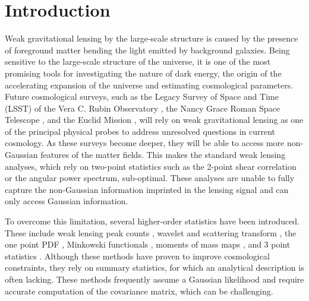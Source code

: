 \documentclass{aa}
\begin{document}
\section{Introduction}
Weak gravitational lensing by the large-scale structure is caused by the presence of foreground matter bending the light emitted by background galaxies. Being sensitive to the large-scale structure of the universe, it is one of the most promising tools for investigating the nature of dark energy, the origin of the accelerating expansion of the universe and estimating cosmological parameters. Future cosmological surveys, such as the Legacy Survey of Space and Time (LSST) of the Vera C. Rubin Observatory \citep{ivezic2019lsst}, the Nancy Grace Roman Space Telescope \citep{spergel2015wide}, and  the Euclid Mission \citep{laureijs2011euclid}, will rely on weak gravitational lensing as one of the principal physical probes to address unresolved questions in current cosmology.
 As these surveys become deeper, they will be able to access more non-Gaussian features of the matter fields. This makes the standard weak lensing analyses, which rely on two-point statistics such as the 2-point shear correlation or the angular power spectrum, sub-optimal. These analyses are unable to fully capture the non-Gaussian information imprinted in the lensing signal and can only access Gaussian information.


To overcome this limitation, several higher-order statistics have been introduced. These include weak lensing peak counts \citep{liu2015cosmology,  liu2015cosmological, lin2015new, kacprzak2016cosmology, peel2017cosmological, shan2018kids, martinet2018kids, ajani2020constraining, harnois2021cosmic, zurcher2022dark}, wavelet and scattering transform \citep{ajani2021starlet, cheng2021weak}, the one point PDF \citep{liu2019constraining, uhlemann2020fisher, boyle2021nuw}, Minkowski functionals \citep{kratochvil2012probing, petri2013cosmology}, moments of mass maps \citep{gatti2021dark},  and 3 point statistics \citep{takada2004cosmological, semboloni2011weak, rizzato2019tomographic, halder2021integrated}. 
Although these methods have proven to improve cosmological constraints, they rely on summary statistics, for which an analytical description is often lacking. These methods frequently assume a Gaussian likelihood and require accurate computation of the covariance matrix, which can be challenging.
\end{document}
